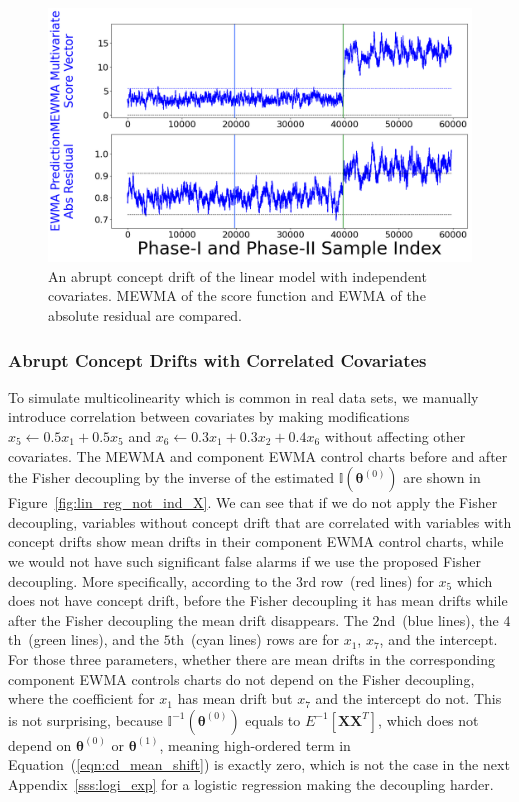 \documentclass[twoside,11pt]{article}
\begin{document}
\begin{appendices}
\begin{figure}[!htp]
\centering
\includegraphics[width = 0.8\linewidth]{../figures/v14/sim_2/reg/1_sim2_lin_1e-08_0_005_1.png}
  \caption{An abrupt concept drift of the linear model with independent covariates. MEWMA of the score function and EWMA of the absolute residual are compared.}
  \label{fig:lin_reg_ind_X_comp}
\end{figure}

\subsubsection{Abrupt Concept Drifts with Correlated Covariates}
\label{ssss:lin_not_ind_pred}
To simulate multicolinearity which is common in real data sets, we manually introduce correlation between {covariates} by making modifications $x_5 \leftarrow 0.5 x_1 + 0.5 x_5$ and $x_6 \leftarrow 0.3 x_1 + 0.3 x_2 + 0.4 x_6$ without affecting other covariates. The MEWMA and component EWMA control charts before and after the Fisher decoupling by {the inverse of the estimated} ${\mathbb {I}}(\bm { \theta}^{(0)})$ are shown in Figure~\ref{fig:lin_reg_not_ind_X}. We can see that if we do not apply the Fisher decoupling, variables without concept drift that are correlated with variables with concept drifts show mean drifts in their component EWMA control charts, while we would not have such significant false alarms if we use the proposed Fisher decoupling. More specifically, according to the $3$rd row~(red lines) for $x_5$ which does not have concept drift, before the Fisher decoupling it has mean drifts while after the Fisher decoupling the mean drift disappears. The $2$nd~(blue lines), the $4$th~(green lines), and the $5$th~(cyan lines) rows are for $x_1$, $x_7$, and the intercept. For those three parameters, whether there are mean drifts in the corresponding component EWMA controls charts do not depend on the Fisher decoupling, where the coefficient for $x_1$ has mean drift but $x_7$ and the intercept do not. This is not surprising, because ${\mathbb {I}} ^{-1}(\bm { \theta}^{(0)})$ equals to $E ^{-1} [\bm {X}\bm {X}^T]$, which does not depend on $ \bm { \theta} ^{(0)}$ or $ \bm { \theta} ^{(1)}$, meaning high-ordered term in Equation~(\ref{eqn:cd_mean_shift}) is exactly zero, which is not the case in the next Appendix~\ref{sss:logi_exp} for a logistic regression making the decoupling harder.


\end{appendices}
\end{document}
